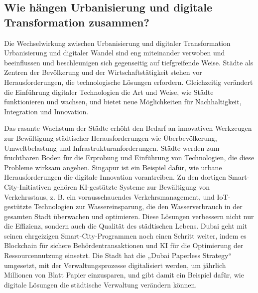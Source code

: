 \documentclass[conference,compsoc,final,a4paper, onecolumn, 11pt]{IEEEtran}
\begin{document}
\subsection{Wie hängen Urbanisierung und digitale Transformation zusammen?}
Die Wechselwirkung zwischen Urbanisierung und digitaler Transformation
Urbanisierung und digitaler Wandel sind eng miteinander verwoben und beeinflussen und beschleunigen sich gegenseitig auf tiefgreifende Weise. 
Städte als Zentren der Bevölkerung und der Wirtschaftstätigkeit stehen vor Herausforderungen, die technologische Lösungen erfordern. 
Gleichzeitig verändert die Einführung digitaler Technologien die Art und Weise, wie Städte funktionieren und wachsen, und bietet neue Möglichkeiten für Nachhaltigkeit, Integration und Innovation. \autocite{european_commission_digital_2019}

Das rasante Wachstum der Städte erhöht den Bedarf an innovativen Werkzeugen zur Bewältigung städtischer Herausforderungen wie Überbevölkerung, Umweltbelastung und Infrastrukturanforderungen. 
Städte werden zum fruchtbaren Boden für die Erprobung und Einführung von Technologien, die diese Probleme wirksam angehen. 
Singapur ist ein Beispiel dafür, wie urbane Herausforderungen die digitale Innovation vorantreiben. 
Zu den dortigen Smart-City-Initiativen gehören \ac{KI}-gestützte Systeme zur Bewältigung von Verkehrsstaus, z. B. 
ein vorausschauendes Verkehrsmanagement, und \ac{IoT}-gestützte Technologien zur Wassereinsparung, die den Wasserverbrauch in der gesamten Stadt überwachen und optimieren. 
Diese Lösungen verbessern nicht nur die Effizienz, sondern auch die Qualität des städtischen Lebens. \autocite{noauthor_smart_nodate}
Dubai geht mit seinen ehrgeizigen Smart-City-Programmen noch einen Schritt weiter, indem es Blockchain für sichere Behördentransaktionen und \ac{KI} für die Optimierung der Ressourcennutzung einsetzt. 
Die Stadt hat die „Dubai Paperless Strategy“ umgesetzt, mit der Verwaltungsprozesse digitalisiert werden, um jährlich Millionen von Blatt Papier einzusparen, und gibt damit ein Beispiel dafür, wie digitale Lösungen die städtische Verwaltung verändern können. \autocite{noauthor_dubai_nodate}
\end{document}
